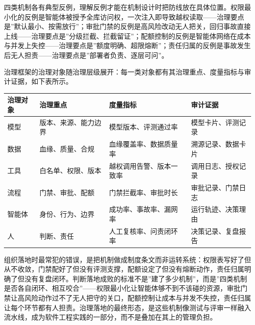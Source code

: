 \documentclass[12pt,a4paper,twoside,openany]{ctexbook}
\numberwithin{figure}{chapter}
\numberwithin{table}{chapter}
\newcounter{none}
\begin{document}
四类机制各有典型反例，理解反例才能在机制设计时把防线放在具体位置。权限最小化的反例是智能体被授予全库访问权，一次注入即导致越权读取------治理要点是''默认最小、按需放行''；审批门禁的反例是高风险改动无人把关，回归事故直接上线------治理要点是''分级拦截、拦截留证''；配额控制的反例是智能体网络在成本与并发上失控------治理要点是''额度明确、超限熔断''；责任归属的反例是事故发生后无人担责------治理要点是''部署者负责、逐层可问''。

治理框架的治理对象随治理层级展开：每一类对象都有其治理重点、度量指标与审计证据，如下表所示。

{\def\LTcaptype{none} %
\begin{longtable}[]{@{}
  >{\raggedright\arraybackslash}p{}
  >{\raggedright\arraybackslash}p{}
  >{\raggedright\arraybackslash}p{}
  >{\raggedright\arraybackslash}p{}@{}}
\toprule\noalign{}
\begin{minipage}[b]{\linewidth}\raggedright
治理对象
\end{minipage} & \begin{minipage}[b]{\linewidth}\raggedright
治理重点
\end{minipage} & \begin{minipage}[b]{\linewidth}\raggedright
度量指标
\end{minipage} & \begin{minipage}[b]{\linewidth}\raggedright
审计证据
\end{minipage} \\
\midrule\noalign{}
\endhead
\bottomrule\noalign{}
\endlastfoot
模型 & 版本、来源、能力边界 & 模型版本、评测通过率 &
模型卡片、评测记录 \\
数据 & 血缘、质量、合规 & 血缘覆盖率、数据质量率 & 溯源记录、数据卡片 \\
工具 & 白名单、权限、版本 & 越权调用告警、版本一致率 &
调用日志、授权记录 \\
流程 & 门禁、审批、配额 & 门禁拦截率、审批时长 & 审批记录、门禁日志 \\
智能体 & 身份、行为、边界 & 成功率、事故率、漏网率 &
运行轨迹、决策理由 \\
人 & 判断、责任 & 人工复核率、问责闭环率 & 决策记录、复盘报告 \\
\end{longtable}
}

组织落地时最常犯的错误，是把机制做成制度条文而非运转系统：权限表写好了但从不收敛，门禁配好了但没有评测支撑，配额设定了但没有熔断动作，责任归属明确了但没有复盘闭环。判断落地成败的标准不是''建了多少机制''，而是''四类机制是否各自闭环、相互咬合''------权限最小化让智能体够不到不该碰的资源，审批门禁让高风险动作过不了无人把守的关口，配额控制让成本与并发不失控，责任归属让每个环节都有人担责。治理落地的最终形态，是这些机制像测试与评审一样融入流水线，成为软件工程实践的一部分，而不是叠加在其上的管理负担。
\end{document}
